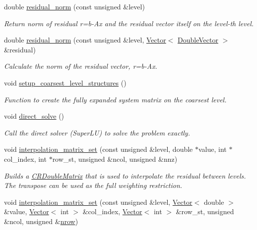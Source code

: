 \begin{DoxyCompactItemize}
double \hyperlink{classoomph_1_1HelmholtzMGPreconditioner_adc1a81bd9eee5b45e5c19cd6dd53d4d9}{residual\+\_\+norm} (const unsigned \&level)
\begin{DoxyCompactList}\small\item\em Return norm of residual r=b-\/\+Ax and the residual vector itself on the level-\/th level. \end{DoxyCompactList}\item 
double \hyperlink{classoomph_1_1HelmholtzMGPreconditioner_ab12e150cab2c6349bf3453d75261fca6}{residual\+\_\+norm} (const unsigned \&level, \hyperlink{classoomph_1_1Vector}{Vector}$<$ \hyperlink{classoomph_1_1DoubleVector}{Double\+Vector} $>$ \&residual)
\begin{DoxyCompactList}\small\item\em Calculate the norm of the residual vector, r=b-\/\+Ax. \end{DoxyCompactList}\item 
void \hyperlink{classoomph_1_1HelmholtzMGPreconditioner_a2436c6189b4cda832bf28471f4f9e23c}{setup\+\_\+coarsest\+\_\+level\+\_\+structures} ()
\begin{DoxyCompactList}\small\item\em Function to create the fully expanded system matrix on the coarsest level. \end{DoxyCompactList}\item 
void \hyperlink{classoomph_1_1HelmholtzMGPreconditioner_a1725e615a59cc6986efd313167295aa5}{direct\+\_\+solve} ()
\begin{DoxyCompactList}\small\item\em Call the direct solver (Super\+LU) to solve the problem exactly. \end{DoxyCompactList}\item 
void \hyperlink{classoomph_1_1HelmholtzMGPreconditioner_a2c7591ae2de4d1c461bca085d3210e73}{interpolation\+\_\+matrix\+\_\+set} (const unsigned \&level, double $\ast$value, int $\ast$col\+\_\+index, int $\ast$row\+\_\+st, unsigned \&ncol, unsigned \&nnz)
\begin{DoxyCompactList}\small\item\em Builds a \hyperlink{classoomph_1_1CRDoubleMatrix}{C\+R\+Double\+Matrix} that is used to interpolate the residual between levels. The transpose can be used as the full weighting restriction. \end{DoxyCompactList}\item 
void \hyperlink{classoomph_1_1HelmholtzMGPreconditioner_a45b4d0a9f16d23b8571ed9b09ca5764d}{interpolation\+\_\+matrix\+\_\+set} (const unsigned \&level, \hyperlink{classoomph_1_1Vector}{Vector}$<$ double $>$ \&value, \hyperlink{classoomph_1_1Vector}{Vector}$<$ int $>$ \&col\+\_\+index, \hyperlink{classoomph_1_1Vector}{Vector}$<$ int $>$ \&row\+\_\+st, unsigned \&ncol, unsigned \&\hyperlink{classoomph_1_1DistributableLinearAlgebraObject_a7569556f14fd68b28508920e89bd5eee}{nrow})

\end{DoxyCompactItemize}
